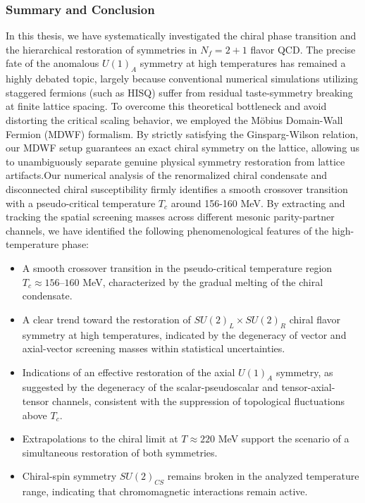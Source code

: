 \subsubsection*{Summary and Conclusion}
In this thesis, we have systematically investigated the chiral phase transition and the hierarchical restoration of symmetries in $N_{f}=2+1$ flavor QCD. The precise fate of the anomalous $U(1)_{A}$ symmetry at high temperatures has remained a highly debated topic, largely because conventional numerical simulations utilizing staggered fermions (such as HISQ) suffer from residual taste-symmetry breaking at finite lattice spacing. To overcome this theoretical bottleneck and avoid distorting the critical scaling behavior, we employed the Möbius Domain-Wall Fermion (MDWF) formalism. By strictly satisfying the Ginsparg-Wilson relation, our MDWF setup guarantees an exact chiral symmetry on the lattice, allowing us to unambiguously separate genuine physical symmetry restoration from lattice artifacts.Our numerical analysis of the renormalized chiral condensate and disconnected chiral susceptibility firmly identifies a smooth crossover transition with a pseudo-critical temperature $T_{c}$ around 156-160 MeV. By extracting and tracking the spatial screening masses across different mesonic parity-partner channels, we have identified the following phenomenological features of the high-temperature phase:
\begin{itemize}
    \item A smooth crossover transition in the pseudo-critical temperature region $T_c \approx 156\text{--}160$ MeV, characterized by the gradual melting of the chiral condensate.
    \item A clear trend toward the restoration of $SU(2)_L \times SU(2)_R$ chiral flavor symmetry at high temperatures, indicated by the degeneracy of vector and axial-vector screening masses within statistical uncertainties.
    \item Indications of an effective restoration of the axial $U(1)_A$ symmetry, as suggested by the degeneracy of the scalar-pseudoscalar and tensor-axial-tensor channels, consistent with the suppression of topological fluctuations above $T_c$.
    \item Extrapolations to the chiral limit at $T \approx 220$ MeV support the scenario of a simultaneous restoration of both symmetries.
    \item Chiral-spin symmetry $SU(2)_{CS}$ remains broken in the analyzed temperature range, indicating that chromomagnetic interactions remain active.
\end{itemize}

